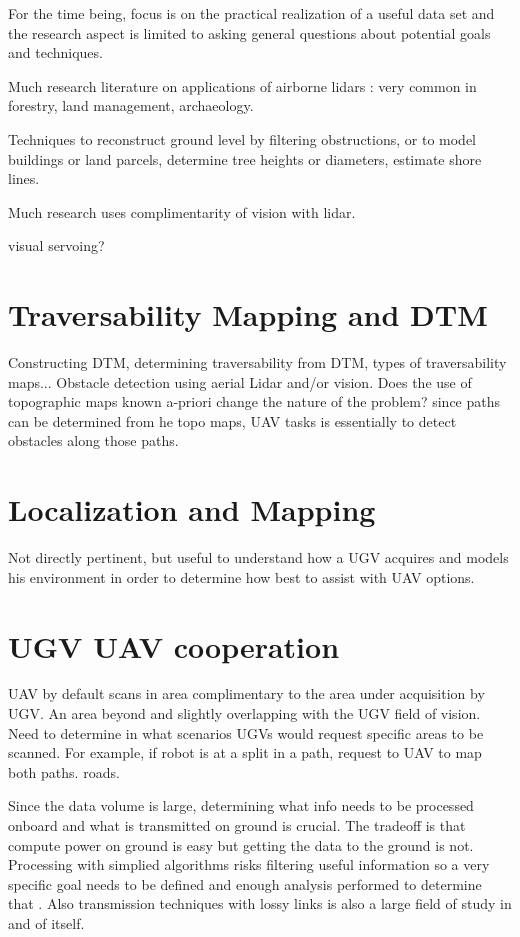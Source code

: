 \documentclass[a4paper,11pt]{report}
\begin{document}
For the time being, focus is on the practical realization of a useful data set and the research aspect is limited to asking general questions about potential goals and techniques.

Much research literature on applications of airborne lidars : very common in forestry, land management, archaeology.

Techniques to reconstruct ground level by filtering obstructions, or to model buildings or land parcels, determine tree heights or diameters, estimate shore lines.

Much research uses complimentarity of vision with lidar. 

visual servoing?

\section{Traversability Mapping and DTM}

Constructing DTM, determining traversability from DTM, types of traversability maps... Obstacle detection using aerial Lidar and/or vision. Does the use of topographic maps known a-priori change the nature of the problem? since paths can be determined from he topo maps, UAV tasks is essentially to detect obstacles along those paths.

\section{Localization and Mapping}

Not directly pertinent, but useful to understand how a UGV acquires and models his environment in order to determine how best to assist with UAV options.

\section{UGV UAV cooperation}

UAV by default scans in area complimentary to the area under acquisition by UGV. An area beyond and slightly overlapping with the UGV field of vision. Need to determine in what scenarios UGVs would request specific areas to be scanned. For example, if robot is at a split in a path, request to UAV to map both paths.  roads.

 Since the data volume is large, determining what info needs to be processed onboard and what is transmitted on ground is crucial. The tradeoff is that compute power on ground is easy but getting the data to the ground is not. Processing with simplied algorithms risks filtering useful information so a very specific goal needs to be defined and enough analysis performed to determine that . Also transmission techniques with lossy links is also a large field of study in and of itself. 
\end{document}
